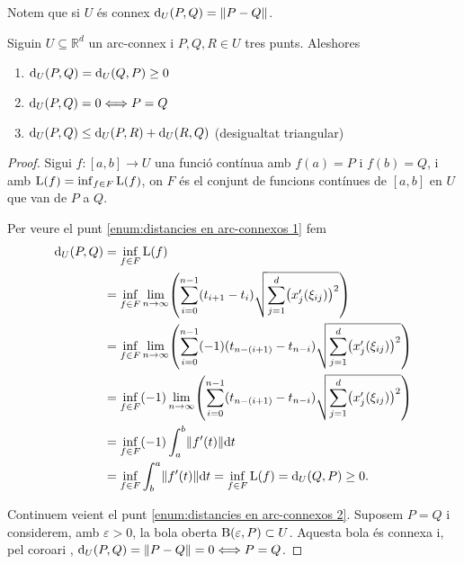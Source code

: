 \documentclass[../Apunts.tex]{subfiles}
\begin{document}
	\begin{observation}\label{obs:connex metrica}
		Notem que si \(U\) és connex \(\Dist_{U}(P,Q)=\norm{P-Q}\).
	\end{observation}
	\begin{proposition}
		Siguin \(U\subseteq\mathbb{R}^{d}\) un arc-connex i \(P,Q,R\in U\) tres punts. Aleshores
		\begin{enumerate}
			\item\label{enum:distancies en arc-connexos 1} \(\operatorname{d}_{U}(P,Q)=\operatorname{d}_{U}(Q,P)\geq0\)
			\item\label{enum:distancies en arc-connexos 2} \(\operatorname{d}_{U}(P,Q)=0\Longleftrightarrow P=Q\)
			\item\label{enum:distancies en arc-connexos 3} \(\operatorname{d}_{U}(P,Q)\leq \operatorname{d}_{U}(P,R)+\operatorname{d}_{U}(R,Q)\) (desigualtat triangular) %
		\end{enumerate}
		\begin{proof}
			Sigui \(f\colon[a,b]\to U\) una funció contínua amb \(f(a)=P\) i \(f(b)=Q\), i  amb \(\operatorname{L}(f)=\inf_{f\in F}\operatorname{L}(f)\), on \(F\) és el conjunt de funcions contínues de \([a,b]\) en \(U\) que van de \(P\) a \(Q\). %
			
			Per veure el punt \eqref{enum:distancies en arc-connexos 1} fem
			\begin{align*}
			\Dist_{U}(P,Q)&=\inf_{f\in F}\Long(f)\\
			&=\inf_{f\in F}\lim_{n\to\infty}\left(\sum_{i=0}^{n-1}(t_{i+1}-t_{i})\sqrt{\sum_{j=1}^{d}\left(x_{j}'(\xi_{ij})\right)^2}\right)\\
			&=\inf_{f\in F}\lim_{n\to\infty}\left(\sum_{i=0}^{n-1}(-1)(t_{n-(i+1)}-t_{n-i})\sqrt{\sum_{j=1}^{d}\left(x_{j}'(\xi_{ij})\right)^2}\right)\\
			&=\inf_{f\in F}(-1)\lim_{n\to\infty}\left(\sum_{i=0}^{n-1}(t_{n-(i+1)}-t_{n-i})\sqrt{\sum_{j=1}^{d}\left(x_{j}'(\xi_{ij})\right)^2}\right)\\
			&=\inf_{f\in F}(-1)\int_{a}^{b}\norm{f'(t)}\text{d}t\\
			&=\inf_{f\in F}\int_{b}^{a}\norm{f'(t)}\text{d}t=\inf_{f\in F}\Long(f)=\Dist_{U}(Q,P)\geq0.
			\end{align*}
			
			Continuem veient el punt \eqref{enum:distancies en arc-connexos 2}. Suposem \(P=Q\) i considerem, amb \(\varepsilon>0\), la bola oberta \(\operatorname{B}(\varepsilon,P)\subset U\). Aquesta bola és connexa i, pel coro{\lgem}ari , \(\Dist_{U}(P,Q)=\norm{P-Q}=0\Longleftrightarrow P=Q\).%
			

\end{proof}
\end{proposition}
\end{document}
